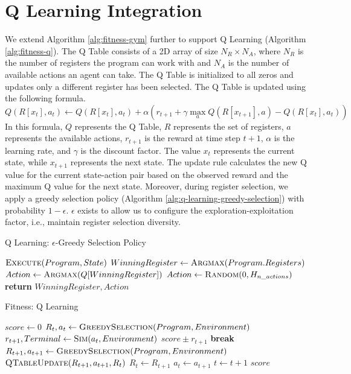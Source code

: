 \documentclass[12pt, final]{dalcsthesis}
\begin{document}
\section{Q Learning Integration}
We extend Algorithm \ref{alg:fitness-gym} further to support Q Learning (Algorithm \ref{alg:fitness-q}).
The Q Table consists of a 2D array of size $N_R \times N_A$, where $N_R$ is the number of registers the program can work with and $N_A$ is the number of available actions an agent can take. The Q Table is initialized to all zeros and updates only a different register has been selected. The Q Table is updated using the following formula.
\begin{equation}
	Q(R[x_t], a_t) \leftarrow Q(R[x_t], a_t) + \alpha \left(r_{t+1} + \gamma \max_a Q(R[x_{t+1}], a) - Q(R[x_t], a_t)\right)
\end{equation}
In this formula, $Q$ represents the Q Table, $R$ represents the set of registers, $a$ represents the available actions, $r_{t+1}$ is the reward at time step $t+1$, $\alpha$ is the learning rate, and $\gamma$ is the discount factor. The value $x_t$ represents the current state, while $x_{t+1}$ represents the next state. The update rule calculates the new Q value for the current state-action pair based on the observed reward and the maximum Q value for the next state.
Moreover, during register selection, we apply a greedy selection policy (Algorithm \ref{alg:q-learning-greedy-selection}) with probability $1-\epsilon$. $\epsilon$ exists to allow us to configure the exploration-exploitation factor, i.e., maintain register selection diversity.

\begin{algorithm}[!htb]
	\caption{Q Learning: $\epsilon$-Greedy Selection Policy}
	\label{alg:q-learning-greedy-selection}
	\begin{algorithmic}[1]
		\State $\Call{Execute}{Program, State}$
		\State $WinningRegister \gets \Call{Argmax}{Program.Registers} $
		\State $Action \gets \Call{Argmax}{Q[WinningRegister]}$
		\State $Action \gets \Call{Random}{0, H_{n\_actions}}$
		\EndIf
		\State \textbf{return} $WinningRegister, Action$
	\end{algorithmic}
\end{algorithm}
\begin{algorithm}[!htb]
	\caption{Fitness: Q Learning}
	\label{alg:fitness-q}
	\begin{algorithmic}[1]
		\State $score \gets 0$
		\State $R_{t}, a_{t} \gets \Call{GreedySelection}{Program, Environment}$
		\State $r_{t + 1}, Terminal \gets \Call{Sim}{a_{t}, Environment}$
		\State $score \pm r_{t + 1}$
		\State \textbf{break}
		\EndIf
		\State $R_{t+1}, a_{t+1} \gets \Call{GreedySelection}{Program, Environment}$
		\State $\Call{QTableUpdate}{R_{t+1}, a_{t+1}, R_{t}}$
		\EndIf
		\State ${R_{t} \leftarrow R_{t+1}}$
		\State ${a_{t} \leftarrow a_{t+1}}$
		\State ${t \leftarrow t+1}$
		\EndWhile
		\State \Return $score$
	\end{algorithmic}
\end{algorithm}
\end{document}

